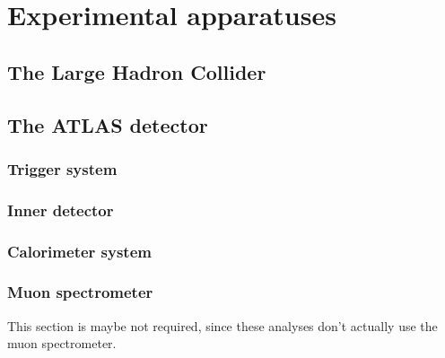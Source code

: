 \chapter{Experimental apparatuses}

\section{The Large Hadron Collider}
\section{The ATLAS detector}
\subsection{Trigger system}
\subsection{Inner detector}
\subsection{Calorimeter system}
\subsection{Muon spectrometer}
This section is maybe not required, since these analyses don't actually use the muon spectrometer.

